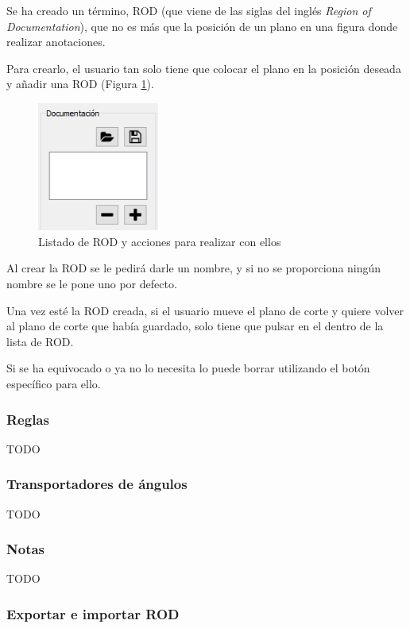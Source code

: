 Se ha creado un término, ROD (que viene de las siglas del inglés \textit{Region of Documentation}), que no es más que la posición de un plano en una figura donde realizar anotaciones.

Para crearlo, el usuario tan solo tiene que colocar el plano en la posición deseada y añadir una ROD (Figura \ref{fig:desarrollo/gui-rod-nuevo}).

\begin{figure}[H]
	\centering
	\includegraphics[width=4cm]{imagenes/desarrollo/gui-rod-nuevo}
	\caption{Listado de ROD y acciones para realizar con ellos}
	\label{fig:desarrollo/gui-rod-nuevo}
\end{figure}

Al crear la ROD se le pedirá darle un nombre, y si no se proporciona ningún nombre se le pone uno por defecto.

Una vez esté la ROD creada, si el usuario mueve el plano de corte y quiere volver al plano de corte que había guardado, solo tiene que pulsar en el dentro de la lista de ROD.

Si se ha equivocado o ya no lo necesita lo puede borrar utilizando el botón específico para ello.

\subsubsection{Reglas}

TODO

\subsubsection{Transportadores de ángulos}

TODO

\subsubsection{Notas}

TODO

\subsubsection{Exportar e importar ROD}

